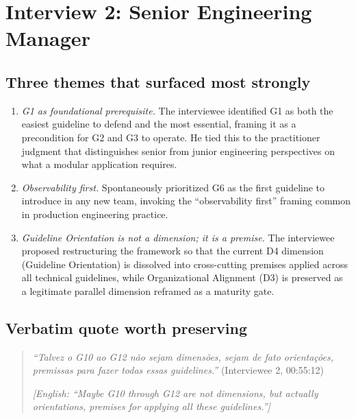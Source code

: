 
\section{Interview 2: Senior Engineering Manager}
\label{sec:interview02}

\subsection*{Three themes that surfaced most strongly}

\begin{enumerate}[itemsep=3pt,topsep=2pt]
  \item \emph{G1 as foundational prerequisite.} The interviewee identified G1 as both the easiest guideline to defend and the most essential, framing it as a precondition for G2 and G3 to operate. He tied this to the practitioner judgment that distinguishes senior from junior engineering perspectives on what a modular application requires.
  \item \emph{Observability first.} Spontaneously prioritized G6 as the first guideline to introduce in any new team, invoking the ``observability first'' framing common in production engineering practice.
  \item \emph{Guideline Orientation is not a dimension; it is a premise.} The interviewee proposed restructuring the framework so that the current D4 dimension (Guideline Orientation) is dissolved into cross-cutting premises applied across all technical guidelines, while Organizational Alignment (D3) is preserved as a legitimate parallel dimension reframed as a maturity gate.
\end{enumerate}

\subsection*{Verbatim quote worth preserving}

\begin{quote}
\emph{``Talvez o G10 ao G12 não sejam dimensões, sejam de fato orientações, premissas para fazer todas essas guidelines.''} (Interviewee 2, 00:55:12)

\medskip

\emph{[English: ``Maybe G10 through G12 are not dimensions, but actually orientations, premises for applying all these guidelines.'']}
\end{quote}

